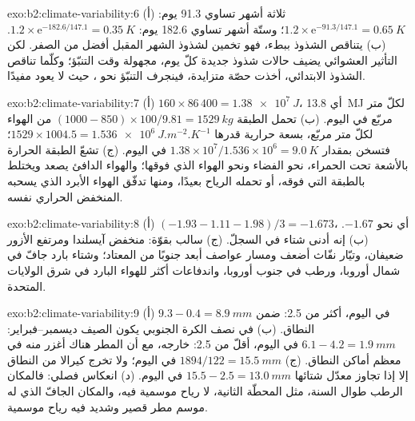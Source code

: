 \begin{solution}{exo:b2:climate-variability:6}
(أ) ثلاثة أشهر تساوي 91.3 يوم: $1.2 \times \mathrm{e}^{-91.3/147.1} = \qty{0.65}{K}$؛ وستّة أشهر
تساوي 182.6 يوم: $1.2 \times \mathrm{e}^{-182.6/147.1} = \qty{0.35}{K}$. (ب) يتناقص الشذوذ
ببطء، فهو تخمين لشذوذ الشهر المقبل أفضل من الصفر. لكن التأثير العشوائي يضيف
حالات شذوذ جديدة كلّ يوم، مجهولة وقت التنبّؤ؛ وكلّما تناقص الشذوذ الابتدائي،
أخذت حصّة متزايدة، فينجرف التنبّؤ نحو ، حيث لا يعود
مفيدًا.
\end{solution}

\begin{solution}{exo:b2:climate-variability:7}
(أ) $160 \times 86\,400 = \qty{1.38e7}{J}$، أي \qty{13.8}{MJ} لكلّ متر مربّع في اليوم. (ب) تحمل
الطبقة $(1000 - 850) \times 100/9.81 = \qty{1529}{kg}$ من الهواء لكلّ متر مربّع، بسعة حرارية
قدرها $1529 \times 1004.5 = \qty{1.536e6}{J.m^{-2}.K^{-1}}$؛ فتسخن بمقدار $1.38 \times
10^7/1.536 \times 10^6 = \qty{9.0}{K}$ في اليوم. (ج) تشعّ الطبقة الحرارة بالأشعة تحت الحمراء، نحو
الفضاء ونحو الهواء الذي فوقها؛ والهواء الدافئ يصعد ويختلط بالطبقة التي فوقه، أو
تحمله الرياح بعيدًا، ومنها تدفّق الهواء الأبرد الذي يسحبه المنخفض الحراري نفسه.
\end{solution}

\begin{solution}{exo:b2:climate-variability:8}
(أ) $(-1.93 - 1.11 - 1.98)/3 = -1.673$، أي نحو $-1.67$. (ب) إنه أدنى شتاء في السجلّ.
(ج)  سالب بقوّة: منخفض آيسلندا ومرتفع الأزور ضعيفان، وتيّار نفّاث أضعف ومسار عواصف
أبعد جنوبًا من المعتاد؛ وشتاء بارد جافّ في شمال أوروبا، ورطب في جنوب أوروبا،
واندفاعات أكثر للهواء البارد في شرق الولايات المتحدة.
\end{solution}

\begin{solution}{exo:b2:climate-variability:9}
(أ) $9.3 - 0.4 = \qty{8.9}{mm}$ في اليوم، أكثر من 2.5: ضمن النطاق. (ب) في نصف الكرة الجنوبي
يكون الصيف ديسمبر--فبراير: $6.1 - 4.2 = \qty{1.9}{mm}$ في اليوم، أقلّ من 2.5: خارجه،
مع أن المطر هناك أغزر منه في معظم أماكن النطاق. (ج) $1894/122 = \qty{15.5}{mm}$ في
اليوم؛ ولا تخرج كيرالا من النطاق إلا إذا تجاوز معدّل شتائها $15.5 - 2.5 = \qty{13.0}{mm}$ في اليوم.
(د)  انعكاس فصلي: فالمكان الرطب طوال السنة، مثل المحطّة
الثانية، لا رياح موسمية فيه، والمكان الجافّ الذي له موسم مطر قصير وشديد فيه رياح موسمية.
\end{solution}

